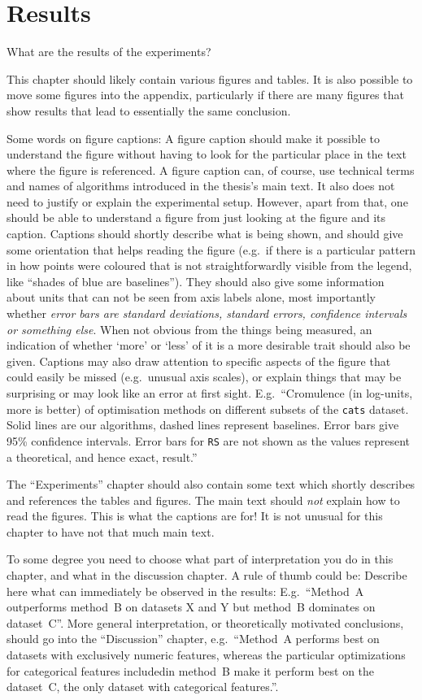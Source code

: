 \chapter{Results}\label{chap:results}

What are the results of the experiments?

This chapter should likely contain various figures and tables.
It is also possible to move some figures into the appendix, particularly if there are many figures that show results that lead to essentially the same conclusion.

Some words on figure captions:
A figure caption should make it possible to understand the figure without having to look for the particular place in the text where the figure is referenced.
A figure caption can, of course, use technical terms and names of algorithms introduced in the thesis's main text.
It also does not need to justify or explain the experimental setup.
However, apart from that, one should be able to understand a figure from just looking at the figure and its caption.
Captions should shortly describe what is being shown, and should give some orientation that helps reading the figure (e.g.\ if there is a particular pattern in how points were coloured that is not straightforwardly visible from the legend, like ``shades of blue are baselines'').
They should also give some information about units that can not be seen from axis labels alone, most importantly whether \emph{error bars are standard deviations, standard errors, confidence intervals or something else}.
When not obvious from the things being measured, an indication of whether `more' or `less' of it is a more desirable trait should also be given.
Captions may also draw attention to specific aspects of the figure that could easily be missed (e.g.\ unusual axis scales), or explain things that may be surprising or may look like an error at first sight.
E.g.\ ``Cromulence (in log-units, more is better) of optimisation methods on different subsets of the \texttt{cats} dataset. Solid lines are our algorithms, dashed lines represent baselines. Error bars give 95\% confidence intervals. Error bars for \texttt{RS} are not shown as the values represent a theoretical, and hence exact, result.''

The ``Experiments'' chapter should also contain some text which shortly describes and references the tables and figures.
The main text should \emph{not} explain how to read the figures.
This is what the captions are for!
It is not unusual for this chapter to have not that much main text.

To some degree you need to choose what part of interpretation you do in this chapter, and what in the discussion chapter.
A rule of thumb could be:
Describe here what can immediately be observed in the results:
E.g.\ ``Method~A outperforms method~B on datasets X and Y but method~B dominates on dataset~C''.
More general interpretation, or theoretically motivated conclusions, should go into the ``Discussion'' chapter, e.g.\ ``Method~A performs best on datasets with exclusively numeric features, whereas the particular optimizations for categorical features includedin method~B make it perform best on the dataset~C, the only dataset with categorical features.''.
